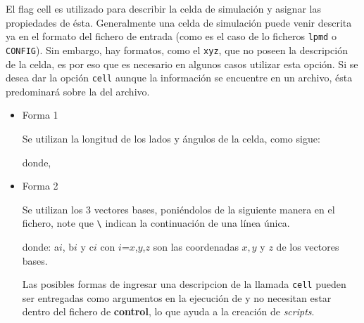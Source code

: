 El flag cell es utilizado para describir la celda de simulaci\'on y asignar las propiedades de \'esta. Generalmente una celda de simulaci\'on puede venir descrita ya en el formato del fichero de entrada (como es el caso de lo ficheros \texttt{lpmd} o \texttt{CONFIG}). Sin embargo, hay formatos, como el \texttt{xyz}, que no poseen la descripci\'on de la celda, es por eso que es necesario en algunos casos utilizar esta opci\'on. Si se desea dar la opci\'on \verb|cell| aunque la informaci\'on se encuentre en un archivo, \'esta predominar\'a sobre la del archivo.

\begin{itemize} 
\item{Forma 1}

Se utilizan la longitud de los lados y \'angulos de la celda, como sigue:


donde,


\item{Forma 2}

Se utilizan los 3 vectores bases, poni\'endolos de la siguiente manera en el fichero, note que \verb|\| indican la continuaci\'on de una l\'inea \'unica.


donde: a${i}$, b${i}$ y c${i}$ con $i$={$x$,$y$,$z$} son las coordenadas $x, y$ y $z$ de los vectores bases.

Las posibles formas de ingresar una descripcion de la llamada \verb|cell| pueden ser entregadas como argumentos en la ejecuci\'on de {\lpmd} y no necesitan estar dentro del fichero de \textbf{control}, lo que ayuda a la creaci\'on de \textit{scripts}.


\end{itemize}
